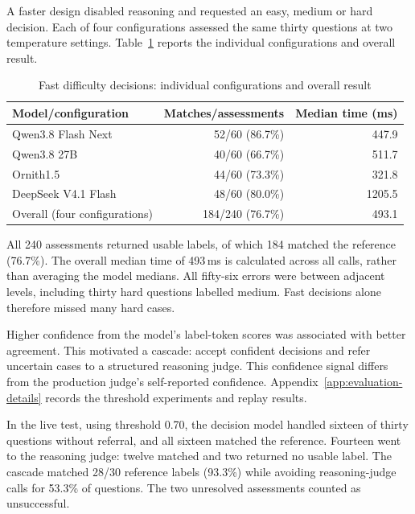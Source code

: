 A faster design disabled reasoning and requested an easy, medium or hard decision. Each of four configurations assessed the same thirty questions at two temperature settings. Table~\ref{tab:decision-difficulty} reports the individual configurations and overall result.

\begin{table}[!htbp]
\centering{}\small
\setlength{\tabcolsep}{5pt}\renewcommand{\arraystretch}{1.15}
\caption{Fast difficulty decisions: individual configurations and overall result}\label{tab:decision-difficulty}
\begin{tabularx}{\linewidth}{@{}X r r@{}}
\toprule
\textbf{Model/configuration} & \textbf{Matches/assessments} & \textbf{Median time (ms)}\\
\midrule
Qwen3.8 Flash Next & 52/60 (86.7\%) & 447.9\\
Qwen3.8 27B & 40/60 (66.7\%) & 511.7\\
Ornith1.5 & 44/60 (73.3\%) & 321.8\\
DeepSeek V4.1 Flash & 48/60 (80.0\%) & 1205.5\\
\midrule
Overall (four configurations) & 184/240 (76.7\%) & 493.1\\
\bottomrule
\end{tabularx}
\end{table}

All 240 assessments returned usable labels, of which 184 matched the reference (76.7\%). The overall median time of 493\,ms is calculated across all calls, rather than averaging the model medians. All fifty-six errors were between adjacent levels, including thirty hard questions labelled medium. Fast decisions alone therefore missed many hard cases.

Higher confidence from the model's label-token scores was associated with better agreement. This motivated a cascade: accept confident decisions and refer uncertain cases to a structured reasoning judge. This confidence signal differs from the production judge's self-reported confidence. Appendix~\ref{app:evaluation-details} records the threshold experiments and replay results.

In the live test, using threshold 0.70, the decision model handled sixteen of thirty questions without referral, and all sixteen matched the reference. Fourteen went to the reasoning judge: twelve matched and two returned no usable label. The cascade matched 28/30 reference labels (93.3\%) while avoiding reasoning-judge calls for 53.3\% of questions. The two unresolved assessments counted as unsuccessful.

